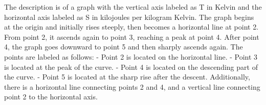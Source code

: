 The description is of a graph with the vertical axis labeled as T in Kelvin and the horizontal axis labeled as S in kilojoules per kilogram Kelvin. The graph begins at the origin and initially rises steeply, then becomes a horizontal line at point 2. From point 2, it ascends again to point 3, reaching a peak at point 4. After point 4, the graph goes downward to point 5 and then sharply ascends again. The points are labeled as follows:
- Point 2 is located on the horizontal line.
- Point 3 is located at the peak of the curve.
- Point 4 is located on the descending part of the curve.
- Point 5 is located at the sharp rise after the descent.
Additionally, there is a horizontal line connecting points 2 and 4, and a vertical line connecting point 2 to the horizontal axis.